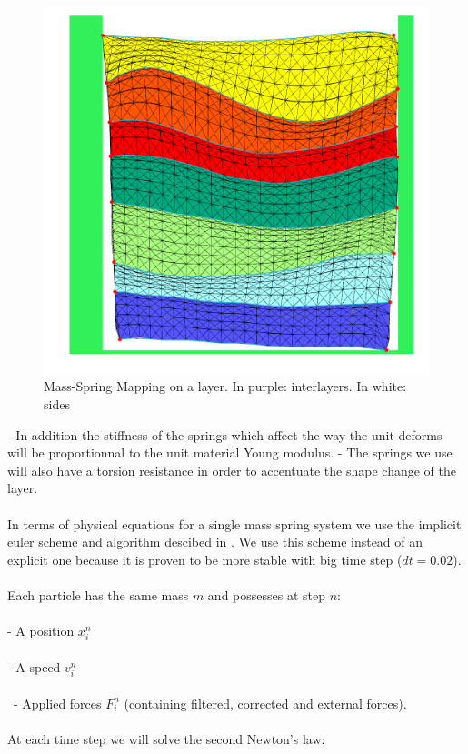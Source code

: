 \documentclass[12pt, a4paper]{memoir} %
\begin{document}
	\begin{figure}[H]
	\centering
	\includegraphics[scale=0.5]{springMapping.png}
	\caption{Mass-Spring Mapping on a layer. In purple: interlayers. In white: sides}
	\end{figure}
	
	\indent	- In addition the stiffness of the springs which affect the way the unit deforms will be proportionnal to the unit material Young modulus. 
\indent	- The springs we use will also have a torsion resistance in order to accentuate the shape change of the layer.\\\\
In terms of physical equations for a single mass spring system we use the implicit euler scheme and algorithm descibed in \citep{caltech}. We use this scheme instead of an explicit one because it is proven to be more stable with big time step ($dt = 0.02$).\\\\ 
Each particle has the same mass $m$ and possesses at step $n$:\\\\
\indent	- A position  $x_i^n$\\\\
\indent	- A speed $v_i^n$ \\\\\
\indent	- Applied forces $F_i^n$ (containing filtered, corrected and external forces).\\\\
At each time step we will solve the second Newton's law:\\
\end{document}

